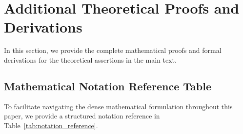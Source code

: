 \onecolumn
{}

\section{Additional Theoretical Proofs and Derivations}
\label{sec:app_proofs}

In this section, we provide the complete mathematical proofs and formal derivations for the theoretical assertions in the main text.

\subsection{Mathematical Notation Reference Table}
To facilitate navigating the dense mathematical formulation throughout this paper, we provide a structured notation reference in Table~\ref{tab:notation_reference}.

